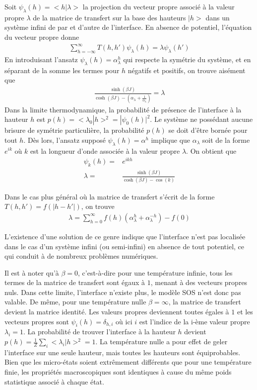 	Soit $\psi_\lambda(h)= <h|\lambda>$ la projection du vecteur propre associé à la valeur propre $\lambda$ de la matrice de transfert sur la base des hauteurs $|h>$ dans un système infini de par et d'autre de l'interface. En absence de potentiel\cite{guyer_sine-gordon_1979}, l'équation du vecteur propre donne
\begin{align}
	\sum_{h=-\infty}^\infty T(h,h') \psi_\lambda(h) = \lambda \psi_\lambda(h')
\end{align}
En introduisant l'ansatz $\psi_\lambda(h) = \alpha_{\lambda}^h$ qui respecte la symétrie du système, et en séparant de la somme les termes pour $h$ négatifs et positifs, on trouve aisément que 
\begin{align}
	\frac{\sinh(\beta J)}{\cosh(\beta J)-(\alpha_{\lambda}+\frac{1}{\alpha_{\lambda}})} = \lambda
\end{align}
Dans la limite thermodynamique, la probabilité de présence de l'interface à la hauteur $h$ est $p(h) = <\lambda_0|h>^2 = |\psi_0(h)|^2$. Le système ne possédant aucune brisure de symétrie particulière, la probabilité $p(h)$ se doit d'être bornée pour tout $h$. Dès lors, l'ansatz supposé $\psi_\lambda(h) = \alpha^h$ implique que $\alpha_{\lambda}$ soit de la forme $e^{ik}$ où $k$ est la longueur d'onde associée à la valeur propre $\lambda$. On obtient que 
\begin{align}
	\psi_k(h) =& e^{ikh} \\
	\lambda =& \frac{\sinh(\beta J)}{\cosh(\beta J) - \cos(k)}
\end{align}


Dans le cas plus général où la matrice de transfert s'écrit de la forme $T(h,h') = f(|h-h'|)$, on trouve 
\begin{align}
	\lambda = \sum_{h=0}^\infty f(h)(\alpha_{\lambda}^h+\alpha_{\lambda}^{-h}) - f(0)
\end{align}

L'existence d'une solution de ce genre indique que l'interface n'est pas localisée dans le cas d'un système infini (ou semi-infini) en absence de tout potentiel, ce qui conduit à de nombreux problèmes numériques. 

Il est à noter qu'à $\beta=0$, c'est-à-dire pour une température infinie, tous les termes de la matrice de transfert sont égaux à $1$, menant à des vecteurs propres nuls. Dans cette limite, l'interface n'existe plus, le modèle SOS n'est donc pas valable. De même, pour une température nulle $\beta=\infty$, la matrice de transfert devient la matrice identité. Les valeurs propres deviennent toutes égales à $1$ et les vecteurs propres sont $\psi_i(h) = \delta_{h,i}$ où ici $i$ est l'indice de la i-ème valeur propre $\lambda_i = 1$. La probabilité de trouver l'interface à la hauteur $h$ devient $p(h) = \frac{1}{Z}\sum_{i} <\lambda_i | h >^2 = 1$. La température nulle a pour effet de geler l'interface sur une seule hauteur, mais toutes les hauteurs sont équiprobables. Bien que les micro-états soient extrêmement différents que pour une température finie, les propriétés macroscopiques sont identiques à cause du même poids statistique associé à chaque état.



